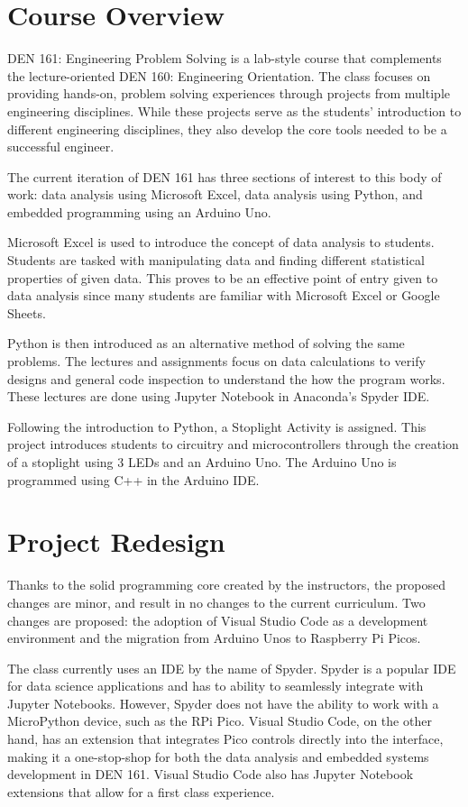 \section{Course Overview}

DEN 161: Engineering Problem Solving is a lab-style course that complements the lecture-oriented DEN 160: 
Engineering Orientation. The class focuses on providing hands-on, problem solving experiences through projects 
from multiple engineering disciplines. While these projects serve as the students' introduction to different 
engineering disciplines, they also develop the core tools needed to be a successful engineer. 

The current iteration of DEN 161 has three sections of interest to this body of work: data analysis using 
Microsoft Excel, data analysis using Python, and embedded programming using an Arduino Uno.

Microsoft Excel is used to introduce the concept of data analysis to students. Students are tasked with 
manipulating data and finding different statistical properties of given data. This proves to be an effective 
point of entry given to data analysis since many students are familiar with Microsoft Excel or Google Sheets.

Python is then introduced as an alternative method of solving the same problems. The lectures and assignments 
focus on data calculations to verify designs and general code inspection to understand the how the program works. 
These lectures are done using Jupyter Notebook in Anaconda's Spyder IDE. 

Following the introduction to Python, a Stoplight Activity is assigned. This project introduces students to 
circuitry and microcontrollers through the creation of a stoplight using 3 LEDs and an Arduino Uno. The Arduino 
Uno is programmed using C++ in the Arduino IDE.

\section{Project Redesign}

Thanks to the solid programming core created by the instructors, the proposed changes are minor, and result in 
no changes to the current curriculum. Two changes are proposed: the adoption of Visual Studio Code as a 
development environment and the migration from Arduino Unos to Raspberry Pi Picos. 

The class currently uses an IDE by the name of Spyder. Spyder is a popular IDE for data science applications and 
has to ability to seamlessly integrate with Jupyter Notebooks. However, Spyder does not have the ability to work 
with a MicroPython device, such as the RPi Pico. Visual Studio Code, on the other hand, has an extension that 
integrates Pico controls directly into the interface, making it a one-stop-shop for both the data analysis and 
embedded systems development in DEN 161. Visual Studio Code also has Jupyter Notebook extensions that allow for 
a first class experience.

